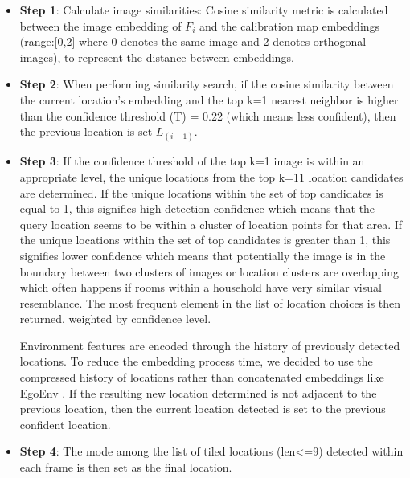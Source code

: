 \begin{itemize}
    \begin{itemize}
            \item \textbf{Step 1}: Calculate image similarities: Cosine similarity metric is calculated between the image embedding of $F_{i}$ and the calibration map embeddings (range:[0,2] where 0 denotes the same image and 2 denotes orthogonal images), to represent the distance between embeddings. 
            \item \textbf{Step 2}: When performing similarity search, if the cosine similarity between the current location’s embedding and the top k=1 nearest neighbor is higher than the confidence threshold (T) = 0.22 (which means less confident), then the previous location is set $L_(i-1)$. 
            \item \textbf{Step 3}: If the confidence threshold of the top k=1 image is within an appropriate level, the unique locations from the top k=11 location candidates are determined. 
                \subitem If the unique locations within the set of top candidates is equal to 1, this signifies high detection confidence which means that the query location seems to be within a cluster of location points for that area. 
                \subitem If the unique locations within the set of top candidates is greater than 1, this signifies lower confidence which means that potentially the image is in the boundary between two clusters of images or location clusters are overlapping which often happens if rooms within a household have very similar visual resemblance. The most frequent element in the list of location choices is then returned, weighted by confidence level.
        
            Environment features are encoded through the history of previously detected locations. To reduce the embedding process time, we decided to use the compressed history of locations rather than concatenated embeddings like EgoEnv \cite{nagarajan2024egoenv}. If the resulting new location determined is not adjacent to the previous location, then the current location detected is set to the previous confident location.
            \item \textbf{Step 4}: The mode among the list of tiled locations (len<=9) detected within each frame is then set as the final location.   
            
        \end{itemize}

    

\end{itemize}

